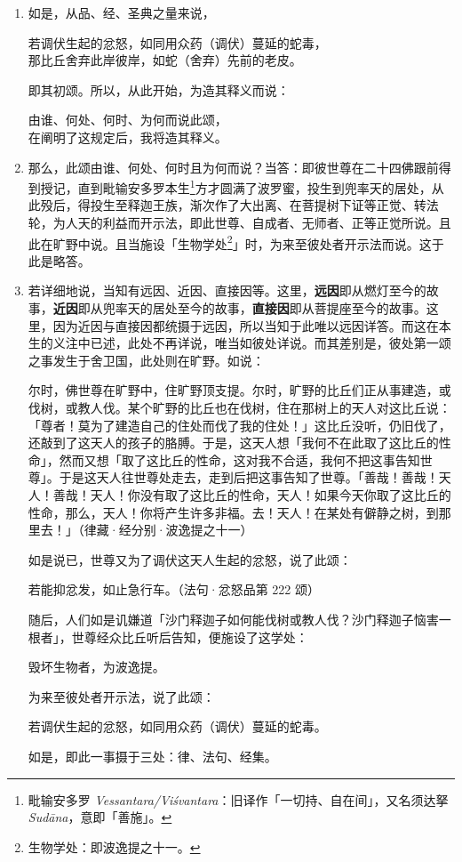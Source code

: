 \begin{enumerate}\item 如是，从品、经、圣典之量来说，\begin{quoting}若调伏生起的忿怒，如同用众药（调伏）蔓延的蛇毒，\\那比丘舍弃此岸彼岸，如蛇（舍弃）先前的老皮。\end{quoting}即其初颂。所以，从此开始，为造其释义而说：\begin{quoting}由谁、何处、何时、为何而说此颂，\\在阐明了这规定后，我将造其释义。\end{quoting}
\item 那么，此颂由谁、何处、何时且为何而说？当答：即彼世尊在二十四佛跟前得到授记，直到毗输安多罗本生\footnote{毗输安多罗 \textit{Vessantara/Viśvantara}：旧译作「一切持、自在间」，又名须达拏 \textit{Sudāna}，意即「善施」。}方才圆满了波罗蜜，投生到兜率天的居处，从此殁后，得投生至释迦王族，渐次作了大出离、在菩提树下证等正觉、转法轮，为人天的利益而开示法，即此世尊、自成者、无师者、正等正觉所说。且此在旷野中说。且当施设「生物学处\footnote{生物学处：即波逸提之十一。}」时，为来至彼处者开示法而说。这于此是略答。
\item 若详细地说，当知有远因、近因、直接因等。这里，\textbf{远因}即从燃灯至今的故事，\textbf{近因}即从兜率天的居处至今的故事，\textbf{直接因}即从菩提座至今的故事。这里，因为近因与直接因都统摄于远因，所以当知于此唯以远因详答。而这在本生的义注中已述，此处不再详说，唯当如彼处详说。而其差别是，彼处第一颂之事发生于舍卫国，此处则在旷野。如说：\begin{quoting}尔时，佛世尊在旷野中，住旷野顶支提。尔时，旷野的比丘们正从事建造，或伐树，或教人伐。某个旷野的比丘也在伐树，住在那树上的天人对这比丘说：「尊者！莫为了建造自己的住处而伐了我的住处！」这比丘没听，仍旧伐了，还敲到了这天人的孩子的胳膊。于是，这天人想「我何不在此取了这比丘的性命」，然而又想「取了这比丘的性命，这对我不合适，我何不把这事告知世尊」。于是这天人往世尊处走去，走到后把这事告知了世尊。「善哉！善哉！天人！善哉！天人！你没有取了这比丘的性命，天人！如果今天你取了这比丘的性命，那么，天人！你将产生许多非福。去！天人！在某处有僻静之树，到那里去！」（律藏·经分别·波逸提之十一）\end{quoting}如是说已，世尊又为了调伏这天人生起的忿怒，说了此颂：\begin{quoting}若能抑忿发，如止急行车。（法句·忿怒品第 222 颂）\end{quoting}随后，人们如是讥嫌道「沙门释迦子如何能伐树或教人伐？沙门释迦子恼害一根者」，世尊经众比丘听后告知，便施设了这学处：\begin{quoting}毁坏生物者，为波逸提。\end{quoting}为来至彼处者开示法，说了此颂：\begin{quoting}若调伏生起的忿怒，如同用众药（调伏）蔓延的蛇毒。\end{quoting}如是，即此一事摄于三处：律、法句、经集。

\end{enumerate}
